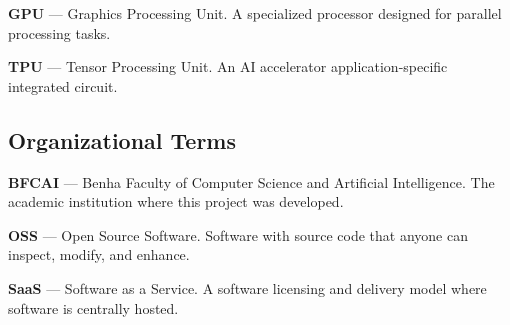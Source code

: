 \vspace{0.2cm}

\noindent\textbf{GPU} --- Graphics Processing Unit. A specialized processor designed for parallel processing tasks.

\vspace{0.2cm}

\noindent\textbf{TPU} --- Tensor Processing Unit. An AI accelerator application-specific integrated circuit.

\subsection*{Organizational Terms}

\vspace{0.3cm}

\noindent\textbf{BFCAI} --- Benha Faculty of Computer Science and Artificial Intelligence. The academic institution where this project was developed.

\vspace{0.2cm}

\noindent\textbf{OSS} --- Open Source Software. Software with source code that anyone can inspect, modify, and enhance.

\vspace{0.2cm}

\noindent\textbf{SaaS} --- Software as a Service. A software licensing and delivery model where software is centrally hosted.
